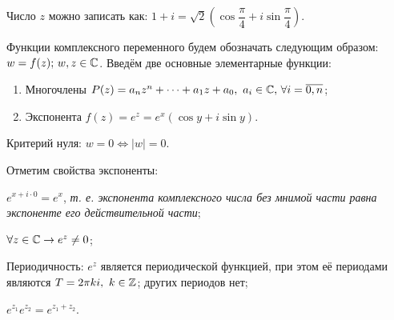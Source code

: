 \begin{example}
\par\noindent

\begin{minipage}[c]{0.3\textwidth}
  \centering
\end{minipage}%
\hfill
\begin{minipage}[c]{0.65\textwidth}
Число \(z\) можно записать как: \(1 + i = \sqrt{2}(\cos{\dfrac{\pi}{4}} + i\sin{\dfrac{\pi}{4}})\).
\end{minipage}
\end{example}


Функции комплексного переменного будем обозначать следующим образом: \(w = f(z); \, w, z\in\mathbb{C}\).
Введём две основные элементарные функции:
\begin{enumerate}
\item Многочлены \(P(z) = a_n z^n + \dots + a_1 z + a_0, \ a_i \in \mathbb{C}, \, \forall i = 
    \overline{0,n}\);
\item Экспонента \(f(z) = e^z = e^x(\cos{y} + i\sin{y})\).
\end{enumerate}

\begin{note}\label{2:criterion_zero}
Критерий нуля: \(w = 0 \iff |w| = 0\).
\end{note}

Отметим свойства экспоненты:
\begin{properties}
\item \(e^{x+i\cdot 0} = e^x\), \textit{т. е. экспонента комплексного числа без мнимой части равна
    экспоненте его действительной части};
\item \label{2:exp_neq_0}\(\forall z \in \mathbb{C} \rightarrow e^z \neq 0\);
\item Периодичность: \(e^z\) является периодической функцией, при этом её периодами являются \(T =
    2\pi k i, \ k\in \mathbb{Z}\); других периодов нет;
\item \label{2:exp_mult} \(e^{z_1} e^{z_2} = e^{z_1 + z_2}\).
\end{properties}

